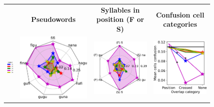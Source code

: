 \hspace{-5ex}
\begin{figure}[ht]
\scriptsize
\hspace{0ex}
\begin{tabular}{lccc}
{} & \textbf{\Large Pseudowords} & \textbf{\Large Syllables in position (F or S)} & \textbf{\Large Confusion cell categories}\\
\vspace{2ex}
\hspace{0ex}
{\includegraphics[width=.07\linewidth]{figures/part_II/subjects_legend.pdf}}
\hspace{-3ex}
&{\includegraphics[width=.3\linewidth]{figures/part_II/roi_plots/visual/radial_word.pdf}}
\hspace{-3ex}
&{\includegraphics[width=.3\linewidth]{figures/part_II/roi_plots/visual/radial_joint.pdf}}
\hspace{-3ex}
&{\includegraphics[width=.3\linewidth]{figures/part_II/roi_plots/visual/super_tests.pdf}}
\hspace{0ex}
\\
\end{tabular}

\end{figure}
